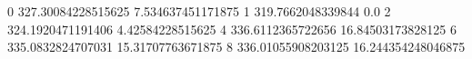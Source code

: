 0 327.30084228515625 7.534637451171875
1 319.7662048339844 0.0
2 324.1920471191406 4.42584228515625
4 336.6112365722656 16.84503173828125
6 335.0832824707031 15.31707763671875
8 336.01055908203125 16.244354248046875
